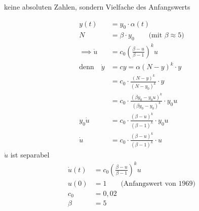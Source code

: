 
keine absoluten Zahlen, sondern Vielfache des Anfangswerts

\begin{align*}
	y(t) &= y_0 \cdot \alpha (t) \\
	N &= \beta \cdot y_0 \qquad\text{(mit $\beta \approx 5$)} \\
	\implies \dot u &= c_0 \left( \frac{\beta - u}{\beta - 1} \right)^k u \\
	\text{denn}\quad \dot y &= c y = \alpha (N - y)^k \cdot y \\
	&= c_0 \cdot \frac{(N - y)^k}{(N - y_0)^k} \cdot y \\
	&= c_0 \cdot \frac{(\beta y_0 - y_0 u)^k}{(\beta y_0 - y_0)^k} \cdot y_0 u \\
	y_0 \dot u &= c_0 \cdot \frac{ (\beta - u)^k }{ ( \beta - 1 )^k } \cdot y_0 u \\
	\dot u &= c_0 \cdot \frac{ (\beta - u)^k }{ ( \beta - 1 )^k } \cdot u
\end{align*}
$\dot u$ ist separabel
\begin{align*}
\dot u(t) &= c_0 \left( \frac{ \beta - u }{\beta - 1} \right)^k u \\
u(0) &= 1 \qquad\text{(Anfangswert von 1969)} \\
c_0 &= 0,02 \\
\beta &= 5
\end{align*}

